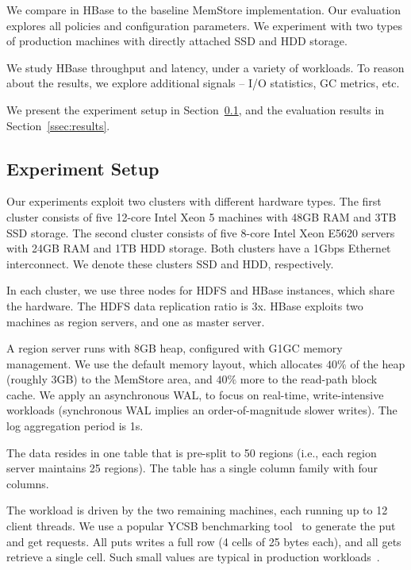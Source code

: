 We compare \sys\/ in HBase to the baseline MemStore implementation.  
Our evaluation explores all \sys\/ policies and configuration parameters.  
We experiment with two types of production machines with directly attached SSD 
and HDD storage. 

We study HBase throughput and latency, under a variety of workloads. 
To reason about the results, we explore additional signals -- I/O statistics, 
GC metrics, etc.  

We present the experiment setup in Section~\ref{ssec:setup}, and the evaluation 
results in Section~\ref{ssec:results}. 

\subsection{Experiment Setup}
\label{ssec:setup}

Our experiments exploit two clusters with different hardware types. The first cluster consists of five 12-core Intel Xeon 5 
machines with 48GB RAM and 3TB SSD storage. The second cluster consists of five 8-core Intel Xeon E5620 servers 
with 24GB RAM and 1TB HDD storage. Both clusters have a 1Gbps Ethernet interconnect. We denote these clusters 
SSD and HDD, respectively.

In each cluster, we use three nodes for HDFS and HBase instances, which share the hardware. The HDFS data 
replication ratio is 3x. HBase exploits two machines as region servers, and one as master server. 

A region server runs  with 8GB heap, configured with G1GC memory management. 
We use the default memory layout,  which allocates $40\%$ of the heap (roughly 3GB) to the MemStore 
area, and $40\%$ more to the read-path block cache. We apply an asynchronous WAL, to focus on real-time, 
write-intensive workloads (synchronous WAL implies an order-of-magnitude slower writes). The log aggregation
period is 1s. 

The data resides in one table that is pre-split to 50 regions (i.e., each region server maintains 25 regions). 
The table has a single column family with four columns. 

The workload is driven by the two remaining machines, each running up to 12 client threads. 
We use a popular YCSB benchmarking tool~\cite{Cooper:2010:BCS:1807128.1807152} to generate 
the put and get requests. All puts writes a full row (4 cells of 25 bytes each), and all gets retrieve
a single cell. Such small values are typical in production workloads~\cite{Wu2015}. 

